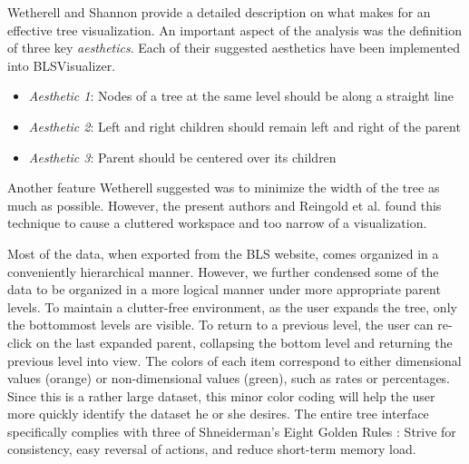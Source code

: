 \documentclass[11pt,letterpaper]{article}
\begin{document}
Wetherell and Shannon \cite{wetherell1979tidy} provide a detailed description on what makes for an effective tree visualization. An important aspect of the analysis was the definition of three key \textit{aesthetics}. Each of their suggested aesthetics have been implemented into BLSVisualizer.

\begin{itemize}
\item \textit{Aesthetic 1}: Nodes of a tree at the same level should be along a straight line
\item \textit{Aesthetic 2}: Left and right children should remain left and right of the parent
\item \textit{Aesthetic 3}: Parent should be centered over its children
\end{itemize}

Another feature Wetherell suggested was to minimize the width of the tree as much as possible. However, the present authors and Reingold et al. \cite{reingold1981tidier} found this technique to cause a cluttered workspace and too narrow of a visualization.

Most of the data, when exported from the BLS website, comes organized in a conveniently hierarchical manner. However, we further condensed some of the data to be organized in a more logical manner under more appropriate parent levels. To maintain a clutter-free environment, as the user expands the tree, only the bottommost levels are visible. To return to a previous level, the user can re-click on the last expanded parent, collapsing the bottom level and returning the previous level into view. The colors of each item correspond to either dimensional values (orange) or non-dimensional values (green), such as rates or percentages. Since this is a rather large dataset, this minor color coding will help the user more quickly identify the dataset he or she desires. The entire tree interface specifically complies with three of Shneiderman's Eight Golden Rules \cite{shneiderman_eight_????}: Strive for consistency, easy reversal of actions, and reduce short-term memory load.
\end{document}
